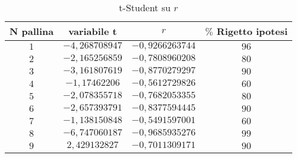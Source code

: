 \documentclass[a4paper,11pt,oneside]{article}
\begin{document}
\begin{table}[h!]
\caption{t-Student su $r$}
\label{tab:t_student}
\centering
\begin{tabular}{|c|c|c|c|}
\hline
 \textbf{N pallina} & \textbf{ variabile t} & \textbf{$r$} & \textbf{{$\%$ Rigetto ipotesi}} \\ \hline
\rowcolor[rgb]{0.85,0.85,0.85}$1$ & $-4,268708947$ & $-0,9266263744$ & $96$ \\ \hline
 $2$ & $-2,165256859$ & $-0,7808960208$ & $80$ \\ \hline
\rowcolor[rgb]{0.85,0.85,0.85}$3$ & $-3,161807619$ & $-0,8770279297$ & $90$ \\ \hline
 $4$ & $-1,17462206$ & $-0,5612729826$ & $60$ \\ \hline
\rowcolor[rgb]{0.85,0.85,0.85}$5$ & $-2,078355718$ & $-0,7682053355$ & $80$ \\ \hline
 $6$ & $-2,657393791$ & $-0,8377594445$ & $90$ \\ \hline
\rowcolor[rgb]{0.85,0.85,0.85}$7$ & $-1,138150848$ & $-0,5491597001$ & $60$ \\ \hline
 $8$ & $-6,747060187$ & $-0,9685935276$ & $99$ \\ \hline
\rowcolor[rgb]{0.85,0.85,0.85}$9$ & $2,429132827$ & $-0,7011309171$ & $90$ \\ \hline
\end{tabular}
\end{table}


\newpage%
\end{document}
